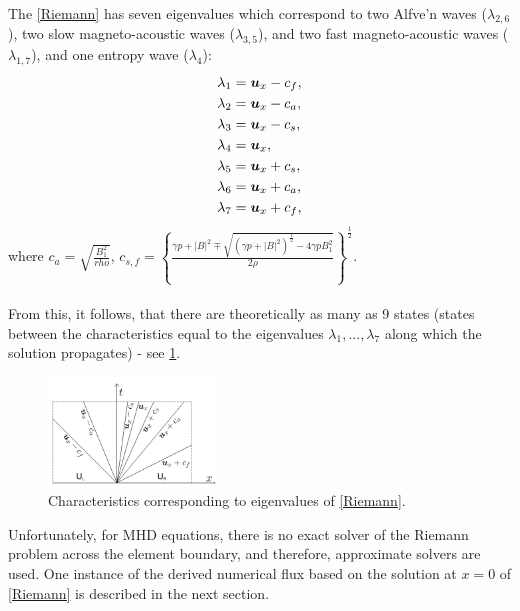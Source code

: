 \paragraph{}
The \cref{Riemann} has seven eigenvalues which correspond to two Alfve'n waves ($\lambda_{2, 6}$), two slow magneto-acoustic waves ($\lambda_{3, 5}$), and two fast magneto-acoustic waves ($\lambda_{1, 7}$), and one entropy wave ($\lambda_{4}$):
\begin{align}
\lambda_{1} & = \mbox{\boldmath $u$}_x - c_f,\\
\lambda_{2} & = \mbox{\boldmath $u$}_x - c_a,\\
\lambda_{3} & = \mbox{\boldmath $u$}_x - c_s,\\
\lambda_{4} & = \mbox{\boldmath $u$}_x,\\
\lambda_{5} & = \mbox{\boldmath $u$}_x + c_s,\\
\lambda_{6} & = \mbox{\boldmath $u$}_x + c_a,\\
\lambda_{7} & = \mbox{\boldmath $u$}_x + c_f,
\end{align}
where $c_a = \sqrt{\frac{B_1^2}{rho}}$, $c_{s, f} = \left\{\frac{\gamma p + |B|^2 \mp \sqrt{\left(\gamma p + |B|^2\right)^{\frac12} - 4\gamma p B_1^2}}{2\rho}\right\}^{\frac12}$.
\paragraph{}
From this, it follows, that there are theoretically as many as 9 states (states between the characteristics equal to the eigenvalues $\lambda_1, ..., \lambda_7$ along which the solution propagates) - see \cref{figure:allRiemannStates}.

\begin{figure}[H]
	\centering
		\includegraphics[width=0.4\textwidth]{img/riemann/allStates.jpg}
		\vspace{-3mm}
	\caption{Characteristics corresponding to eigenvalues of \cref{Riemann}.}
	\label{figure:allRiemannStates}
\end{figure}

Unfortunately, for MHD equations, there is no exact solver of the Riemann problem across the element boundary, and therefore, approximate solvers are used. One instance of the derived numerical flux based on the solution at $x = 0$ of \cref{Riemann} is described in the next section.

